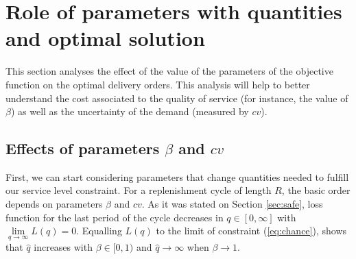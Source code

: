 
{






\section{Role of parameters with quantities and optimal solution}
\label{sec:parameters}
This section analyses the effect of the value of the parameters of the objective function on the optimal delivery orders. This analysis will help to better understand the cost associated to the quality of service (for instance, the value of $\beta$) as well as the uncertainty of the demand (measured by $cv$).

\subsection{Effects of parameters $\beta$ and $cv$}
First, we can start considering parameters that change quantities needed to fulfill our service level  constraint. For a replenishment cycle of length $R$, the basic order depends on parameters $\beta$ and $cv$. As it was stated on Section \ref{sec:safe}, loss function for the last period of the cycle decreases in $q\in[0,\infty]$ with $\lim \limits_{q \to \infty}L(q)=0$. Equalling $L(q)$ to %
the limit of constraint (\ref{eq:chance}), shows that $\hat{q}$ increases with $\beta \in [0,1)$ and $\hat{q}\rightarrow \infty$ when $\beta \rightarrow 1$.


}
